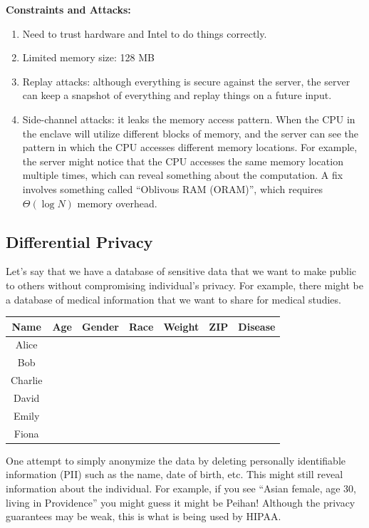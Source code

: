 \textbf{Constraints and Attacks:}

\begin{enumerate}
    \item Need to trust hardware and Intel to do things correctly.
    \item Limited memory size: 128 MB
    \item Replay attacks: although everything is secure against the server, the server can keep a snapshot of everything and replay things on a future input.
    \item Side-channel attacks: it leaks the memory access pattern. When the CPU in the enclave will utilize different blocks of memory, and the server can see the pattern in which the CPU accesses different memory locations. For example, the server might notice that the CPU accesses the same memory location multiple times, which can reveal something about the computation. A fix involves something called ``Oblivous RAM (ORAM)'', which requires $\Theta (\log N)$ memory overhead.
\end{enumerate}

\subsection{Differential Privacy}

Let's say that we have a database of sensitive data that we want to make public to others without compromising individual's privacy. For example, there might be a database of medical information that we want to share for medical studies.

\begin{center}
    \begin{tabular}{|c|c|c|c|c|c|c|}
        \hline
        Name & Age & Gender & Race & Weight & ZIP & Disease\\ \hline
        Alice & & & & & &\\ \hline
        Bob & & & & & &\\ \hline
        Charlie & & & & & &\\ \hline
        David & & & & & &\\ \hline
        Emily & & & & & &\\ \hline
        Fiona & & & & & &\\ \hline
    \end{tabular}
\end{center}

One attempt to simply anonymize the data by deleting personally identifiable information (PII) such as the name, date of birth, etc. This might still reveal information about the individual. For example, if you see ``Asian female, age 30, living in Providence'' you might guess it might be Peihan! Although the privacy guarantees may be weak, this is what is being used by HIPAA.


